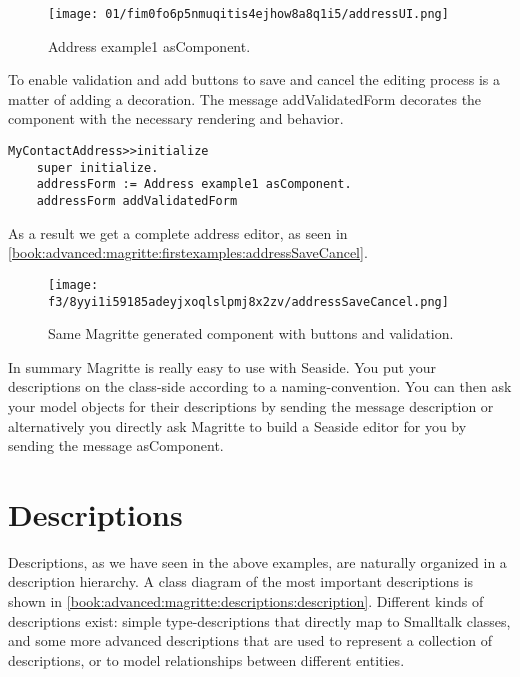 \documentclass[a4paper,10pt,twoside]{book}
\newcommand{\ct}[1]{{\small\ttfamily\textup{#1}}}
\begin{document}
\begin{figure}[h!tbp]
	\begin{center}
		\texttt{[image: 01/fim0fo6p5nmuqitis4ejhow8a8q1i5/addressUI.png]}
		\caption{Address example1 asComponent.\label{book:advanced:magritte:firstexamples:addressUI}}
	\end{center}
\end{figure}


To enable validation and add buttons to save and cancel the editing process is a matter of adding a decoration. The message \ct{addValidatedForm} decorates the component with the necessary rendering and behavior.

\begin{lstlisting}
MyContactAddress>>initialize
    super initialize.
    addressForm := Address example1 asComponent.
    addressForm addValidatedForm
\end{lstlisting}

As a result we get a complete address editor, as seen in \autoref{book:advanced:magritte:firstexamples:addressSaveCancel}.

\begin{figure}[h!tbp]
	\begin{center}
		\texttt{[image: f3/8yyi1i59185adeyjxoqlslpmj8x2zv/addressSaveCancel.png]}
		\caption{Same Magritte generated component with buttons and validation.\label{book:advanced:magritte:firstexamples:addressSaveCancel}}
	\end{center}
\end{figure}


In summary Magritte is really easy to use with Seaside. You put your descriptions on the class-side according to a naming-convention. You can then ask your model objects for their descriptions by sending the message \ct{description} or alternatively you directly ask Magritte to build a Seaside editor for you by sending the message \ct{asComponent}.

\section{Descriptions}
\label{book:advanced:magritte:descriptions}

Descriptions, as we have seen in the above examples, are naturally organized in a description hierarchy. A class diagram of the most important descriptions is shown in \autoref{book:advanced:magritte:descriptions:description}. Different kinds of descriptions exist: simple type-descriptions that directly map to Smalltalk classes, and some more advanced descriptions that are used to represent a collection of descriptions, or to model relationships between different entities.
\end{document}

